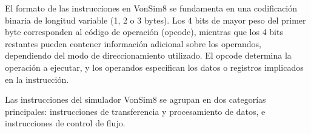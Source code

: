 \documentclass[12pt,oneside]{templates/unerthesis}
\begin{document}
El formato de las instrucciones en VonSim8 se fundamenta en una codificación binaria de longitud variable (1, 2 o 3 bytes). Los 4 bits de mayor peso del primer byte corresponden al código de operación (opcode), mientras que los 4 bits restantes pueden contener información adicional sobre los operandos, dependiendo del modo de direccionamiento utilizado. El opcode determina la operación a ejecutar, y los operandos especifican los datos o registros implicados en la instrucción.

Las instrucciones del simulador VonSim8 se agrupan en dos categorías principales: instrucciones de transferencia y procesamiento de datos, e instrucciones de control de flujo.

\begin{table}[!h]
\centering
\caption{\label{tab:tisaredu}Categoría de instrucciones y códigos de operación en VonSim8}
\centering
{}
\end{table}
\end{document}
